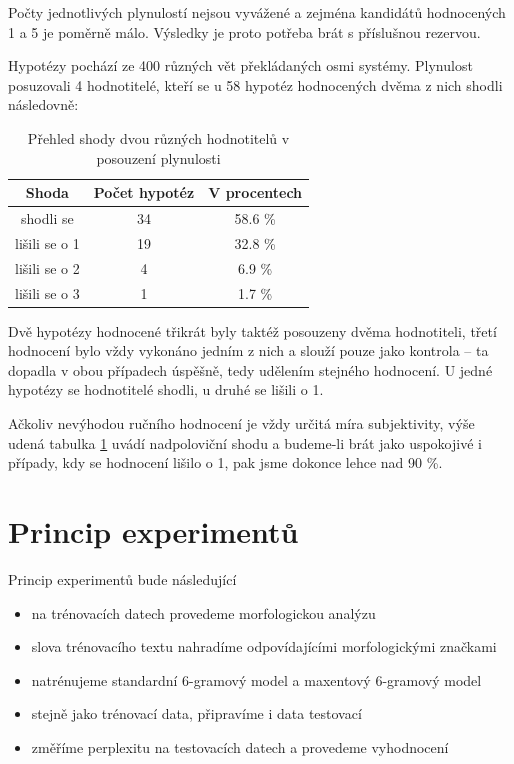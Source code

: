 \documentclass[12pt,a4paper]{report}
\begin{document}

Počty jednotlivých plynulostí nejsou vyvážené a zejména kandidátů hodnocených 1 a 5 je poměrně málo. Výsledky je proto potřeba brát s příslušnou rezervou.

\pagebreak

Hypotézy pochází ze 400 různých vět překládaných osmi systémy. Plynulost posuzovali 4 hodnotitelé, kteří se u 58 hypotéz hodnocených dvěma z nich shodli následovně:

\begin{table}[!htbp]
\begin{center}\begin{tabular}{|c|c|c|}
	\hline
	\textbf{Shoda} & \textbf{Počet hypotéz} & \textbf{V procentech}\\
	\hline
	shodli se & 34 & 58.6 \%\\
	\hline
	lišili se o 1 & 19 & 32.8 \%\\
	\hline
	lišili se o 2 & 4 & 6.9 \%\\
	\hline
	lišili se o 3 & 1 & 1.7 \%\\
	\hline
\end{tabular}
\caption{Přehled shody dvou různých hodnotitelů v posouzení plynulosti}\label{tb:shoda}
\end{center}\end{table}

Dvě hypotézy hodnocené třikrát byly taktéž posouzeny dvěma hodnotiteli, třetí hodnocení bylo vždy vykonáno jedním z nich a slouží pouze jako kontrola -- ta dopadla v obou případech úspěšně, tedy udělením stejného hodnocení. U jedné hypotézy se hodnotitelé shodli, u druhé se lišili o 1.

Ačkoliv nevýhodou ručního hodnocení je vždy určitá míra subjektivity, výše udená tabulka \ref{tb:shoda} uvádí nadpoloviční shodu a budeme-li brát jako uspokojivé i případy, kdy se hodnocení lišilo o 1, pak jsme dokonce lehce nad 90 \%.

\section{Princip experimentů}

Princip experimentů bude následující
\begin{itemize}
\item{na trénovacích datech provedeme morfologickou analýzu}
\item{slova trénovacího textu nahradíme odpovídajícími morfologickými značkami}
\item{natrénujeme standardní 6-gramový model a maxentový 6-gramový model}
\item{stejně jako trénovací data, připravíme i data testovací}
\item{změříme perplexitu na testovacích datech a provedeme vyhodnocení}
\end{itemize}
\end{document}
